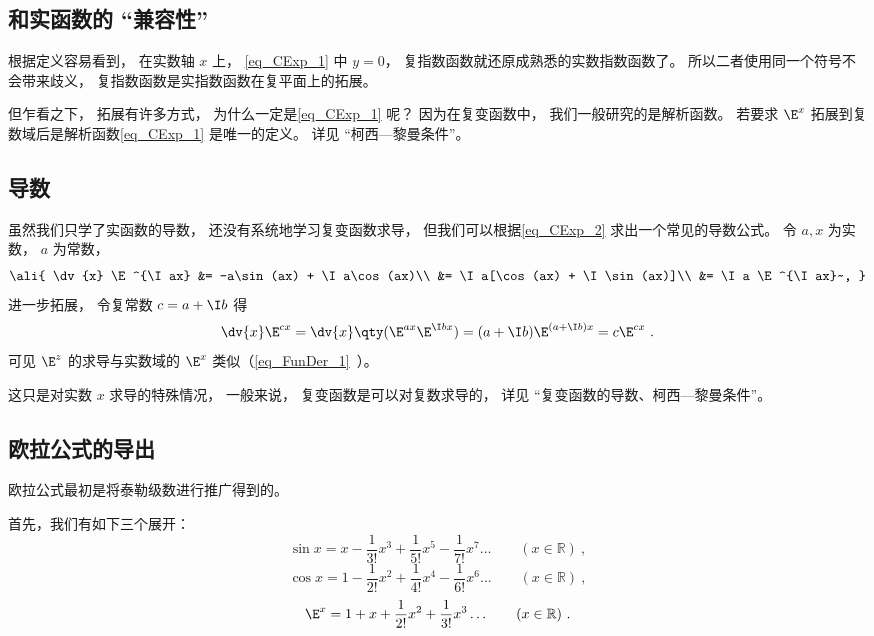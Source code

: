 \subsection{和实函数的 “兼容性”}
根据定义容易看到， 在实数轴 $x$ 上， \autoref{eq_CExp_1} 中 $y = 0$， 复指数函数就还原成熟悉的实数指数函数了。 所以二者使用同一个符号不会带来歧义， 复指数函数是实指数函数在复平面上的拓展。

但乍看之下， 拓展有许多方式， 为什么一定是\autoref{eq_CExp_1} 呢？ 因为在复变函数中， 我们一般研究的是解析函数。 若要求 $\E^x$ 拓展到复数域后是解析函数\autoref{eq_CExp_1} 是唯一的定义。 详见 “柯西—黎曼条件”。

\subsection{导数}
虽然我们只学了实函数的导数， 还没有系统地学习复变函数求导， 但我们可以根据\autoref{eq_CExp_2} 求出一个常见的导数公式。 令 $a, x$ 为实数， $a$ 为常数，
\begin{equation}\ali{
\dv{x} \E^{\I ax} &= -a\sin(ax) + \I a\cos(ax)\\
&= \I a[\cos(ax) + \I \sin(ax)]\\
&= \I a \E^{\I ax}~,
}\end{equation}
进一步拓展， 令复常数 $c = a + \I b$ 得
\begin{equation}
\dv{x}\E^{c x} = \dv{x} \qty(\E^{ax}\E^{\I bx}) = (a + \I b)\E^{(a+\I b)x} = c\E^{cx}~.
\end{equation}
可见 $\E^z$ 的求导与实数域的 $\E^x$ 类似（\autoref{eq_FunDer_1}~）。

这只是对实数 $x$ 求导的特殊情况， 一般来说， 复变函数是可以对复数求导的， 详见 “复变函数的导数、柯西—黎曼条件”。

\subsection{欧拉公式的导出}

欧拉公式最初是将泰勒级数进行推广得到的。

首先，我们有如下三个展开：
\begin{equation}\label{eq_CExp_3}
\sin x = x - \frac{1}{3!} x^3 + \frac{1}{5!} x^5 - \frac{1}{7!} x^7 \ldots
\qquad (x \in \mathbb R)~,
\end{equation}
\begin{equation}\label{eq_CExp_5}
\cos x = 1 - \frac{1}{2!} x^2 + \frac{1}{4!} x^4 -\frac{1}{6!} x^6 \ldots
\qquad (x \in \mathbb R)~,
\end{equation}
\begin{equation}
\E^x =1 + x + \frac{1}{2!} x^2 + \frac{1}{3!} x^3  \ldots
\qquad (x \in \mathbb R)~.
\end{equation}


